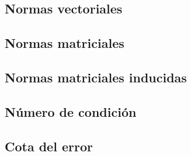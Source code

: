 \subsection{Normas vectoriales}\label{subsec:normas_vectoriales}

\subsection{Normas matriciales}\label{subsec:normas_matriciales}

\subsection{Normas matriciales inducidas}\label{subsec:normas_matriciales_inducidas}

\subsection{Número de condición}\label{subsec:numero_de_condicion}

\subsection{Cota del error}\label{subsec:cota_de_error}



